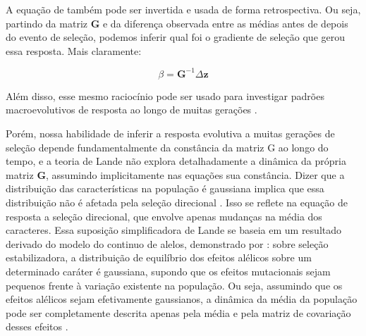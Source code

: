 A equação de \cite{Lande1979} também pode ser invertida e usada de forma
retrospectiva.
Ou seja, partindo da matriz $\mathbf{G}$ e da diferença observada entre as médias
antes de depois do evento de seleção, podemos inferir qual foi o
gradiente de seleção que gerou essa resposta.
Mais claramente:

\begin{equation}
    \beta = \mathbf{G}^{-1}\Delta \mathbf{z}
\end{equation}

Além disso, esse mesmo raciocínio pode ser usado para investigar padrões
macroevolutivos de resposta ao longo de muitas gerações
\citep[veja também a equação \ref{betatotal}]{Lande1983, Marroig2004, Marroig2005}.

Porém, nossa habilidade de inferir a resposta evolutiva a muitas
gerações de seleção depende fundamentalmente da constância da matriz G
ao longo do tempo, e a teoria de Lande não explora
detalhadamente a dinâmica da própria matriz $\mathbf{G}$, assumindo implicitamente
nas equações sua constância.
Dizer que a distribuição das características na população é 
gaussiana implica que essa distribuição não é afetada pela seleção direcional
\citep{Barton1987}.
Isso se reflete na equação de resposta a seleção direcional, que envolve
apenas mudanças na média dos caracteres.
Essa suposição simplificadora de Lande se baseia em um resultado
derivado do modelo do continuo de alelos, demonstrado por
\cite{Kimura1965}: sobre seleção estabilizadora, a
distribuição de equilíbrio dos efeitos alélicos sobre um determinado
caráter é gaussiana, supondo que os efeitos mutacionais sejam pequenos
frente à variação existente na população.
Ou seja, assumindo que os efeitos alélicos sejam efetivamente
gaussianos, a dinâmica da média da população pode ser completamente
descrita apenas pela média e pela matriz de covariação desses efeitos
\citep{Barton1987}.

